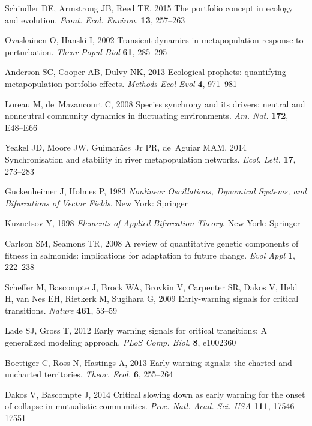 \documentclass{revtex4}
\begin{document}
\begin{thebibliography}{10}
Schindler DE, Armstrong JB, Reed TE, 2015 {The portfolio concept in ecology and
  evolution}.
\newblock \emph{Front. Ecol. Environ.} \textbf{13}, 257--263

Ovaskainen O, Hanski I, 2002 {Transient dynamics in metapopulation response to
  perturbation}.
\newblock \emph{Theor Popul Biol} \textbf{61}, 285--295

Anderson SC, Cooper AB, Dulvy NK, 2013 {Ecological prophets: quantifying
  metapopulation portfolio effects}.
\newblock \emph{Methods Ecol Evol} \textbf{4}, 971--981

Loreau M, de~Mazancourt C, 2008 {Species synchrony and its drivers: neutral and
  nonneutral community dynamics in fluctuating environments}.
\newblock \emph{Am. Nat.} \textbf{172}, E48--E66

Yeakel JD, Moore JW, Guimar{\~a}es~Jr PR, de~Aguiar MAM, 2014 {Synchronisation
  and stability in river metapopulation networks}.
\newblock \emph{Ecol. Lett.} \textbf{17}, 273--283

Guckenheimer J, Holmes P, 1983 \emph{{Nonlinear Oscillations, Dynamical
  Systems, and Bifurcations of Vector Fields}}.
\newblock New York: Springer

Kuznetsov Y, 1998 \emph{{Elements of Applied Bifurcation Theory}}.
\newblock New York: Springer

Carlson SM, Seamons TR, 2008 {A review of quantitative genetic components of
  fitness in salmonids: implications for adaptation to future change}.
\newblock \emph{Evol Appl} \textbf{1}, 222--238

Scheffer M, Bascompte J, Brock WA, Brovkin V, Carpenter SR, Dakos V, Held H,
  van Nes EH, Rietkerk M, Sugihara G, 2009 {Early-warning signals for critical
  transitions}.
\newblock \emph{Nature} \textbf{461}, 53--59

Lade SJ, Gross T, 2012 {Early warning signals for critical transitions: A
  generalized modeling approach}.
\newblock \emph{PLoS Comp. Biol.} \textbf{8}, e1002360

Boettiger C, Ross N, Hastings A, 2013 {Early warning signals: the charted and
  uncharted territories}.
\newblock \emph{Theor. Ecol.} \textbf{6}, 255--264

Dakos V, Bascompte J, 2014 {Critical slowing down as early warning for the
  onset of collapse in mutualistic communities}.
\newblock \emph{Proc. Natl. Acad. Sci. USA} \textbf{111}, 17546--17551


\end{thebibliography}
\end{document}

